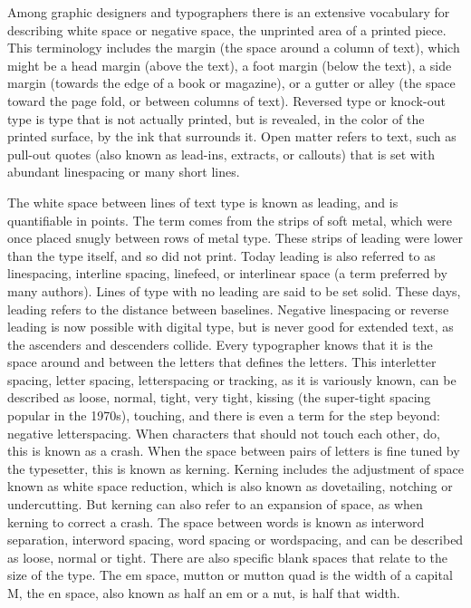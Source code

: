 \documentclass[12pt,a4paper,twocolumn]{book} %
\begin{document}
Among graphic designers and typographers there is an extensive vocabulary for describing white space or negative space, the unprinted area of a printed piece. This terminology includes the margin (the space around a column of text), which might be a head margin (above the text), a foot margin (below the text), a side margin (towards the edge of a book or magazine), or a gutter or alley (the space toward the page fold, or between columns of text). Reversed type or knock-out type is type that is not actually printed, but is revealed, in the color of the printed surface, by the ink that surrounds it. Open matter refers to text, such as pull-out quotes (also known as lead-ins, extracts, or callouts) that is set with abundant linespacing or many short lines.

The white space between lines of text type is known as leading, and is quantifiable in points. The term comes from the strips of soft metal, which were once placed snugly between rows of metal type. These strips of leading were lower than the type itself, and so did not print. Today leading is also referred to as linespacing, interline spacing, linefeed, or interlinear space (a term preferred by many authors). Lines of type with no leading are said to be set solid. These days, leading refers to the distance between baselines. Negative linespacing or reverse leading is now possible with digital type, but is never good for extended text, as the ascenders and descenders collide.
Every typographer knows that it is the space around and between the letters that defines the letters. This interletter spacing, letter spacing, letterspacing or tracking, as it is variously known, can be described as loose, normal, tight, very tight, kissing (the super-tight spacing popular in the 1970s), touching, and there is even a term for the step beyond: negative letterspacing.
When characters that should not touch each other, do, this is known as a crash. When the space between pairs of letters is fine tuned by the typesetter, this is known as kerning. Kerning includes the adjustment of space known as white space reduction, which is also known as dovetailing, notching or undercutting. But kerning can also refer to an expansion of space, as when kerning to correct a crash.
The space between words is known as interword separation, interword spacing, word spacing or wordspacing, and can be described as loose, normal or tight. There are also specific blank spaces that relate to the size of the type. The em space, mutton or mutton quad is the width of a capital M, the en space, also known as half an em or a nut, is half that width.
\end{document}
